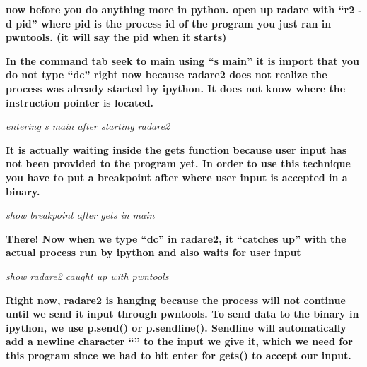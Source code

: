 \documentclass[letterpaper]{article}
\newcommand{\sitfig}[3]{
\begin{figure}[H]
\centering
\makebox[\textwidth][c]{
#2
}
\label{#1}
\end{figure}
}
\newcommand{\sitgfx}[4][scale=1.0]{
\sitfig{#3}{\texttt{[image: \#2]}}{#4}
}
\begin{document}
  
\sitgfx[width=5.8335in,height=3.6457in]{FINALWORKINGDOCFORMERLYPRECURSOR-img098.png}{fig:unk}{TODO CAPTION}
 

\textbf{now before you do anything more in python. open up radare with ``r2 -d pid'' where pid is the process id of the
program you just ran in pwntools. (it will say the pid when it starts)}

  
\sitgfx[width=5.8335in,height=3.6457in]{FINALWORKINGDOCFORMERLYPRECURSOR-img099.png}{fig:unk}{TODO CAPTION}
 

\textbf{In the command tab seek to main using ``s main'' it is import that you do not type ``dc'' right now because
radare2 does not realize the process was already started by ipython. It does not know where the instruction pointer is
located.}

  
\sitgfx[width=5.8335in,height=3.6457in]{FINALWORKINGDOCFORMERLYPRECURSOR-img100.png}{fig:unk}{TODO CAPTION}
 

\textit{entering s main after starting radare2}

\textbf{It is actually waiting inside the gets function because user input has not been provided to the program yet. In
order to use this technique you have to put a breakpoint after where user input is accepted in a binary.}

  
\sitgfx[width=5.8335in,height=3.6457in]{FINALWORKINGDOCFORMERLYPRECURSOR-img101.png}{fig:unk}{TODO CAPTION}
 

\textit{show breakpoint after gets in main}

\textbf{There! Now when we type ``dc'' in radare2, it ``catches up'' with the actual process run by ipython and also
waits for user input}

  
\sitgfx[width=5.8335in,height=3.6457in]{FINALWORKINGDOCFORMERLYPRECURSOR-img102.png}{fig:unk}{TODO CAPTION}
 

\textit{show radare2 caught up with pwntools}

\textbf{Right now, radare2 is hanging because the process will not continue until we send it input through pwntools. To
send data to the binary in ipython, we use p.send() or p.sendline(). Sendline will automatically add a newline
character ``'' to the input we give it, which we need for this program since we had to hit enter for gets() to accept
our input.}\newline
  
\sitgfx[width=5.8335in,height=3.6457in]{FINALWORKINGDOCFORMERLYPRECURSOR-img103.png}{fig:unk}{TODO CAPTION}
 
\end{document}
